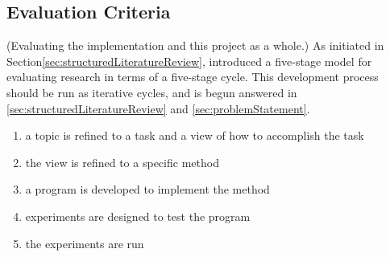 \subsection{Evaluation Criteria}
(Evaluating the implementation and this project as a whole.)
As initiated in Section\vref{sec:structuredLiteratureReview}, \citet{cohen88} introduced a five-stage model for evaluating research in terms of a five-stage cycle. This development process should be run as iterative cycles, and is begun answered in \vref{sec:structuredLiteratureReview} and \vref{sec:problemStatement}.
\begin{enumerate}
\item a topic is refined to a task and a view of how to accomplish the task
\item the view is refined to a specific method
\item a program is developed to implement the method
\item experiments are designed to test the program
\item the experiments are run
\end{enumerate} 